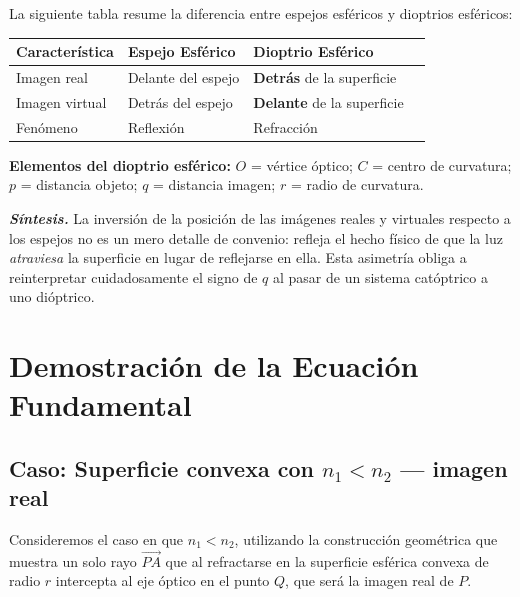 \documentclass[12pt, a4paper]{article}
\theoremstyle{definition}
\begin{document}
La siguiente tabla resume la diferencia entre espejos esféricos y dioptrios esféricos:

\begin{center}
\begin{tabular}{@{}llll@{}}
\toprule
\textbf{Característica} & \textbf{Espejo Esférico} & \textbf{Dioptrio Esférico} \\
\midrule
Imagen real    & Delante del espejo  & \textbf{Detrás} de la superficie  \\
Imagen virtual & Detrás del espejo   & \textbf{Delante} de la superficie \\
Fenómeno       & Reflexión           & Refracción                        \\
\bottomrule
\end{tabular}
\end{center}

\textbf{Elementos del dioptrio esférico:}
\(O\) = vértice óptico; \(C\) = centro de curvatura; \(p\) = distancia objeto;
\(q\) = distancia imagen; \(r\) = radio de curvatura.

\textit{\textbf{Síntesis.}} La inversión de la posición de las imágenes reales y virtuales
respecto a los espejos no es un mero detalle de convenio: refleja el hecho físico de que
la luz \textit{atraviesa} la superficie en lugar de reflejarse en ella. Esta asimetría
obliga a reinterpretar cuidadosamente el signo de \(q\) al pasar de un sistema catóptrico
a uno dióptrico.

\section{Demostración de la Ecuación Fundamental}

\subsection{Caso: Superficie convexa con \texorpdfstring{\(n_1 < n_2\)}{n1 < n2}
            --- imagen real}

Consideremos el caso en que \(n_1 < n_2\), utilizando la construcción geométrica que
muestra un solo rayo \(\overrightarrow{PA}\) que al refractarse en la superficie esférica
convexa de radio \(r\) intercepta al eje óptico en el punto \(Q\), que será la imagen real
de \(P\).
\end{document}
